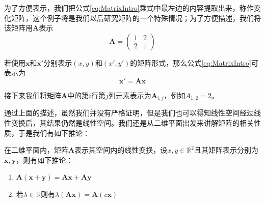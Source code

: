 为了方便表示，我们把公式\ref{eq:MatrixIntro}乘式中最左边的内容提取出来，称作变化矩阵，这个例子将是我们以后研究矩阵的一个特殊情况；为了方便描述，我们将该矩阵用$\mathbf{A}$表示
$$\mathbf{A}=\begin{pmatrix}  
	1 & 2 \\  
	2 & 1  
  \end{pmatrix}$$

若使用$\boldsymbol{x}$和$\boldsymbol{x'}$分别表示$(x,y)$和$(x',y')$的矩阵形式，那么公式\ref{eq:MatrixIntro}可表示为$$\boldsymbol{x'}=\mathbf{A}\boldsymbol{x}$$

接下来我们将矩阵$\mathbf{A}$中的第$i$行第$j$列元素表示为$\mathbf{A}_{i,j}$，例如$A_{1,2}=2$。

通过上面的描述，虽然我们并没有严格证明，但是我们也可以得知线性空间经过线性变换后，其结果仍然是线性空间。我们还是从二维平面出发来讲解矩阵的相关性质，于是我们有如下推论：

\begin{corollary}
	在二维平面内，矩阵$\mathbf{A}$表示其空间内的线性变换，设$x,y \in \mathbb{R}^2$且其矩阵表示分别为$\boldsymbol{x},\boldsymbol{y}$，则有如下推论：
	\begin{enumerate}
		\item $\mathbf{A}(\boldsymbol{x}+\boldsymbol{y})=\mathbf{A}\boldsymbol{x}+\mathbf{A}\boldsymbol{y}$
		\item 若$\lambda \in \mathbb{R}$则有$\lambda (\mathbf{A}\boldsymbol{x})=\mathbf{A}(c\boldsymbol{x})$
	\end{enumerate}
\end{corollary}

